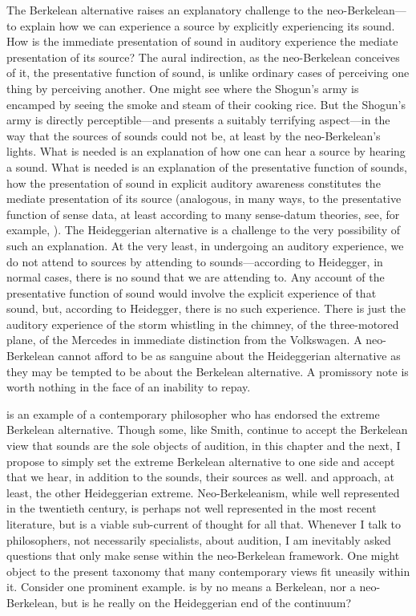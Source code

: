 The Berkelean alternative raises an explanatory challenge to the neo-Berkelean---\-to explain how we can experience a source by explicitly experiencing its sound. How is the immediate presentation of sound in auditory experience the mediate presentation of its source? The aural indirection, as the neo-Berkelean conceives of it, the presentative function of sound, is unlike ordinary cases of perceiving one thing by perceiving another. One might see where the Shogun's army is encamped by seeing the smoke and steam of their cooking rice. But the Shogun's army is directly perceptible---and presents a suitably terrifying aspect---in the way that the sources of sounds could not be, at least by the neo-Berkelean's lights. What is needed is an explanation of how one can hear a source by hearing a sound. What is needed is an explanation of the presentative function of sounds, how the presentation of sound in explicit auditory awareness constitutes the mediate presentation of its source (analogous, in many ways, to the presentative function of sense data, at least according to many sense-datum theories, see, for example, \citealt{Price:1932fk}). The Heideggerian alternative is a challenge to the very possibility of such an explanation. At the very least, in undergoing an auditory experience, we do not attend to sources by attending to sounds---according to Heidegger, in normal cases, there is no sound that we are attending to. Any account of the presentative function of sound would involve the explicit experience of that sound, but, according to Heidegger, there is no such experience. There is just the auditory experience of the storm whistling in the chimney, of the three-motored plane, of the Mercedes in immediate distinction from the Volkswagen. A neo-Berkelean cannot afford to be as sanguine about the Heideggerian alternative as they may be tempted to be about the Berkelean alternative. A promissory note is worth nothing in the face of an inability to repay.

\citet{Smith:2002sa} is an example of a contemporary philosopher who has endorsed the extreme Berkelean alternative. Though some, like Smith, continue to accept the Berkelean view that sounds are the sole objects of audition, in this chapter and the next, I propose to simply set the extreme Berkelean alternative to one side and accept that we hear, in addition to the sounds, their sources as well.  \citet{Leddington:2014aa} and \citet{Nudds:2010aa} approach, at least, the other Heideggerian extreme. Neo-Berkeleanism, while well represented in the twentieth century, is perhaps not well represented in the most recent literature, but is a viable sub-current of thought for all that. Whenever I talk to philosophers, not necessarily specialists, about audition, I am inevitably asked questions that only make sense within the neo-Berkelean framework. One might object to the present taxonomy that many contemporary views fit uneasily within it. Consider one prominent example. \citet{OCallaghan:2007xy,OCallaghan:2009aa} is by no means a Berkelean, nor a neo-Berkelean, but is he really on the Heideggerian end of the continuum? 

